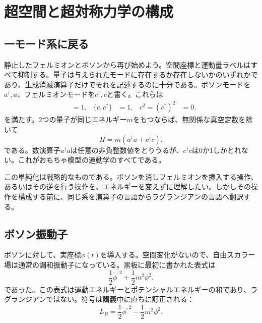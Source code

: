\chapter{超空間と超対称力学の構成}


\section{一モード系に戻る}

静止したフェルミオンとボソンから再び始めよう。空間座標と運動量ラベルはすべて抑制する。量子は与えられたモードに存在するか存在しないかのいずれかであり、生成消滅演算子だけでそれを記述するのに十分である。ボソンモードを\(a^\dagger,a\)、フェルミオンモードを\(c^\dagger,c\)と書く。これらは
\begin{align}
[a,a^\dagger]&=1,
&
\{c,c^\dagger\}&=1,
&
c^2=(c^\dagger)^2&=0.
\end{align}
を満たす。2つの量子が同じエネルギー\(m\)をもつならば、無関係な真空定数を除いて
\begin{equation}
H=m\left(a^\dagger a+c^\dagger c\right).
\label{eq:l7-one-mode-hamiltonian}
\end{equation}
である。数演算子\(a^\dagger a\)は任意の非負整数値をとりうるが、\(c^\dagger c\)は0か1しかとれない。これがおもちゃ模型の運動学のすべてである。

この単純化は戦略的なものである。ボソンを消しフェルミオンを挿入する操作、あるいはその逆を行う操作を、エネルギーを変えずに理解したい。しかしその操作を構成する前に、同じ系を演算子の言語からラグランジアンの言語へ翻訳する。

\section{ボソン振動子}

ボソンに対して、実座標\(\phi(t)\)を導入する。空間変化がないので、自由スカラー場は通常の調和振動子になっている。黒板に最初に書かれた表式は
\[
\frac{1}{2}\dot\phi^{,2}+\frac{1}{2}m^2\phi^2.
\]
であった。この表式は運動エネルギーとポテンシャルエネルギーの和であり、ラグランジアンではない。符号は講義中に直ちに訂正される：
\begin{equation}
L_B=\frac{1}{2}\dot\phi^{,2}-\frac{1}{2}m^2\phi^2.
\label{eq:l7-boson-lagrangian}
\end{equation}


